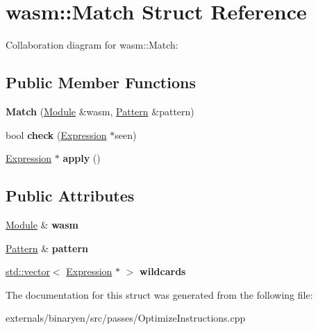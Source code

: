 \hypertarget{structwasm_1_1_match}{}\section{wasm\+:\+:Match Struct Reference}
\label{structwasm_1_1_match}


Collaboration diagram for wasm\+:\+:Match\+:
\subsection*{Public Member Functions}
\begin{DoxyCompactItemize}
\item 
\mbox{\label{structwasm_1_1_match_aa31579b6819925c20998eb92908037bd}} 
{\bfseries Match} (\mbox{\hyperlink{classwasm_1_1_module}{Module}} \&wasm, \mbox{\hyperlink{structwasm_1_1_pattern}{Pattern}} \&pattern)
\item 
\mbox{\label{structwasm_1_1_match_a5553578c3eb0bd9fe447298724341df1}} 
bool {\bfseries check} (\mbox{\hyperlink{classwasm_1_1_expression}{Expression}} $\ast$seen)
\item 
\mbox{\label{structwasm_1_1_match_a2c5477ef4ba704d2f79c7e3300b25643}} 
\mbox{\hyperlink{classwasm_1_1_expression}{Expression}} $\ast$ {\bfseries apply} ()
\end{DoxyCompactItemize}
\subsection*{Public Attributes}
\begin{DoxyCompactItemize}
\item 
\mbox{\label{structwasm_1_1_match_a568d394f40e29ddf1d5bd2736e6149c5}} 
\mbox{\hyperlink{classwasm_1_1_module}{Module}} \& {\bfseries wasm}
\item 
\mbox{\label{structwasm_1_1_match_a85567905798b6de28c6872ac57410156}} 
\mbox{\hyperlink{structwasm_1_1_pattern}{Pattern}} \& {\bfseries pattern}
\item 
\mbox{\label{structwasm_1_1_match_a721fe801b686c0bf9011ceb9f3e47c15}} 
\mbox{\hyperlink{classstd_1_1vector}{std\+::vector}}$<$ \mbox{\hyperlink{classwasm_1_1_expression}{Expression}} $\ast$ $>$ {\bfseries wildcards}
\end{DoxyCompactItemize}


The documentation for this struct was generated from the following file\+:\begin{DoxyCompactItemize}
\item 
externals/binaryen/src/passes/Optimize\+Instructions.\+cpp\end{DoxyCompactItemize}
